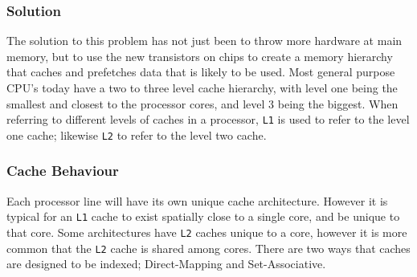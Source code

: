 \documentclass[bsc,frontabs,twoside,singlespacing,parskip,deptreport]{infthesis}     %
\begin{document}
\subsubsection{Solution}
The solution to this problem has not just been to throw more hardware at main memory, but to use the new transistors on chips to create a memory hierarchy that caches and prefetches data that is likely to be used. Most general purpose CPU's today have a two to three level cache hierarchy, with level one being the smallest and closest to the processor cores, and level 3 being the biggest. When referring to different levels of caches in a processor, \texttt{L1} is used to refer to the level one cache; likewise \texttt{L2} to refer to the level two cache.
\par
\subsubsection{Cache Behaviour}
Each processor line will have its own unique cache architecture. However it is typical for an \texttt{L1} cache to exist spatially close to a single core, and be unique to that core. Some architectures have \texttt{L2} caches unique to a core, however it is more common that the \texttt{L2} cache is shared among cores. There are two ways that caches are designed to be indexed; Direct-Mapping and Set-Associative.
\end{document}
